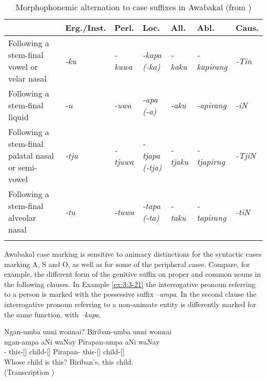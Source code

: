 \begin{table}
    \begin{tabularx}{\textwidth}{Qllllll}
        \lsptoprule
         & Erg./Inst. & Perl. & Loc. & All. & Abl. & Caus.  \\
        \midrule
        Following a stem-final vowel or velar nasal	& \textit{-ku} &	\textit{-kuwa} &	\textit{-kapa (-ka)}	& \textit{-kaku}	& \textit{-kapirang}	& \textit{-Tin} \\
        \tablevspace
        Following a stem-final liquid &	\textit{-u}	& \textit{-uwa} & \textit{-apa \newline (-a)} & \textit{-aku} & \textit{-apirang} & \textit{-iN} \\
        \tablevspace
        Following a stem-final palatal nasal or semi- vowel	& \textit{-tju} & \textit{-tjuwa}	& \textit{-tjapa (-tja)}	& \textit{-tjaku} & \textit{-tjapirng} & \textit{-TjiN} \\
        \tablevspace
        Following a stem-final alveolar nasal &	\textit{-tu}	& \textit{-tuwa} & \textit{-tapa (-ta)} &	\textit{-taku} &	\textit{-tapirang} &	\textit{-tiN} \\
        \lspbottomrule
    \end{tabularx}
    \caption{Morphophonemic alternation to case suffixes in Awabakal (from \citealt[26]{lissarrague_salvage_2006})}
    \label{tab:chap3:MorphophonemicAwabakal}
\end{table}

Awabakal case marking is sensitive to animacy distinctions for the syntactic cases marking A, S and O, as well as for some of the peripheral cases. Compare, for example, the different form of the genitive suffix on proper and common nouns in the following clauses. In Example \ref{ex:3:3-21} the interrogative pronoun referring to a person is marked with the possessive suffix \textit{–ampa}. In the second clause the interrogative pronoun referring to a non-animate entity is differently marked for the same function, with \textit{–kupa}.

\ea\label{ex:3:3-21}
\glll Ngan-umba       unni      	      wonnai?             Biriban-umba       unni   	               wonnai \\
ngan-ampa       aNi         	      waNay               Pirapan-ampa     aNi      	waNay \\
-   this-[]    child-[]     Pirapan-      this-[]       child-[] \\
\glt Whose child is this? Biriban’s, this child. \\
(Transcription \citealt[42]{lissarrague_salvage_2006}) 
\z

